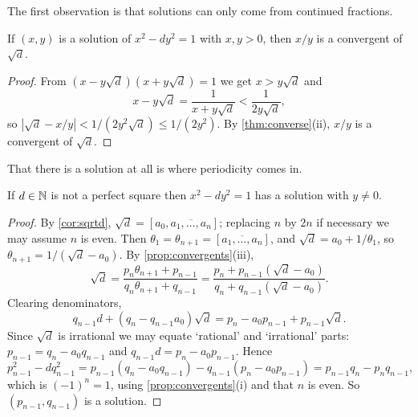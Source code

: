 \documentclass[a4paper]{scrartcl}
\begin{document}
The first observation is that solutions can only come from continued fractions.

\begin{proposition}\label{prop:pellconv}
	If $(x,y)$ is a solution of $x^2 - dy^2 = 1$ with $x, y > 0$, then $x/y$ is a convergent of $\sqrt d$.
\end{proposition}
\begin{proof}
	From $(x - y\sqrt d)(x+y\sqrt d) = 1$ we get $x > y\sqrt d$ and
	$$
	x - y\sqrt d = \frac1{x+y\sqrt d} < \frac1{2y\sqrt d},
	$$
	so $|\sqrt d - x/y| < 1/(2y^2\sqrt d) \leq 1/(2y^2)$. By \autoref{thm:converse}(ii), $x/y$ is a convergent of $\sqrt d$.
\end{proof}

That there is a solution at all is where periodicity comes in.

\begin{theorem}[Pell]\label{nt-thm:pell}
	If $d \in \mathbb{N}$ is not a perfect square then $x^2 - dy^2 = 1$ has a solution with $y \neq 0$.
\end{theorem}
\begin{proof}
	By \autoref{cor:sqrtd}, $\sqrt d = [a_0, \overline{a_1, \dots, a_n}]$; replacing $n$ by $2n$ if necessary we may assume $n$ is even. Then $\theta_1 = \theta_{n+1} = [\overline{a_1, \dots, a_n}]$, and $\sqrt d = a_0 + 1/\theta_1$, so $\theta_{n+1} = 1/(\sqrt d - a_0)$. By \autoref{prop:convergents}(iii),
	$$
	\sqrt d = \frac{p_n\theta_{n+1}+p_{n-1}}{q_n\theta_{n+1}+q_{n-1}} = \frac{p_n + p_{n-1}(\sqrt d - a_0)}{q_n + q_{n-1}(\sqrt d - a_0)}.
	$$
	Clearing denominators,
	$$
	q_{n-1}d + (q_n - q_{n-1}a_0)\sqrt d = p_n - a_0p_{n-1} + p_{n-1}\sqrt d.
	$$
	Since $\sqrt d$ is irrational we may equate `rational' and `irrational' parts: $p_{n-1} = q_n - a_0q_{n-1}$ and $q_{n-1}d = p_n - a_0p_{n-1}$. Hence
	$$
	p_{n-1}^2 - dq_{n-1}^2 = p_{n-1}(q_n - a_0q_{n-1}) - q_{n-1}(p_n - a_0p_{n-1}) = p_{n-1}q_n - p_nq_{n-1},
	$$
	which is $(-1)^n = 1$,
	using \autoref{prop:convergents}(i) and that $n$ is even. So $(p_{n-1}, q_{n-1})$ is a solution.
\end{proof}
\end{document}
